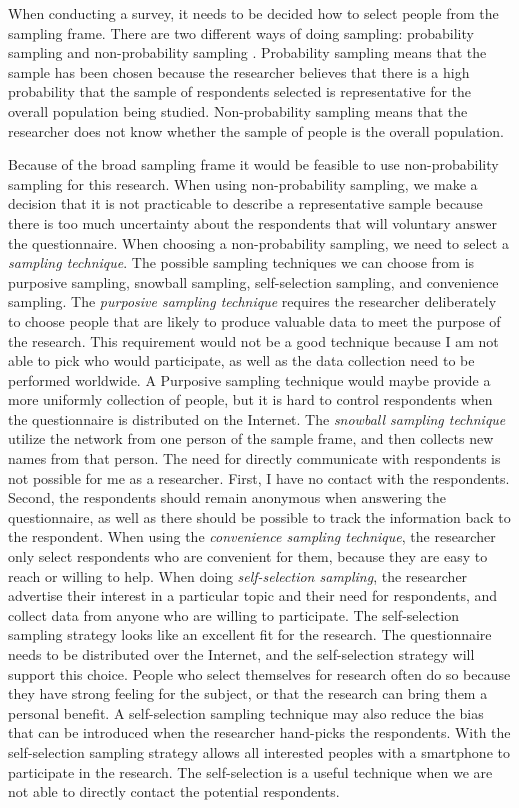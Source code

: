     When conducting a survey, it needs to be decided how to select people from the sampling frame. There are two different ways of doing sampling: probability sampling and non-probability sampling \cite{empiriske}. Probability sampling means that the sample has been chosen because the researcher believes that there is a high probability that the sample of respondents selected is representative for the overall population being studied. Non-probability sampling means that the researcher does not know whether the sample of people is the overall population.

    Because of the broad sampling frame it would be feasible to use non-probability sampling for this research. When using non-probability sampling, we make a decision that it is not practicable to describe a representative sample because there is too much uncertainty about the respondents that will voluntary answer the questionnaire. When choosing a non-probability sampling, we need to select a {\it sampling technique}. The possible sampling techniques we can choose from is purposive sampling, snowball sampling, self-selection sampling, and convenience sampling. 
    The {\it purposive sampling technique} requires the researcher deliberately to choose people that are likely to produce valuable data to meet the purpose of the research. This requirement would not be a good technique because I am not able to pick who would participate, as well as the data collection need to be performed worldwide. A Purposive sampling technique would maybe provide a more uniformly collection of people, but it is hard to control respondents when the questionnaire is distributed on the Internet. 
    The {\it snowball sampling technique} utilize the network from one person of the sample frame, and then collects new names from that person. The need for directly communicate with respondents is not possible for me as a researcher. {First}, I have no contact with the respondents. {Second}, the respondents should remain anonymous when answering the questionnaire, as well as there should be possible to track the information back to the respondent. 
    When using the {\it convenience sampling technique}, the researcher only select respondents who are convenient for them, because they are easy to reach or willing to help. 
    When doing {\it self-selection sampling}, the researcher advertise their interest in a particular topic and their need for respondents, and collect data from anyone who are willing to participate. The self-selection sampling strategy looks like an excellent fit for the research. The questionnaire needs to be distributed over the Internet, and the self-selection strategy will support this choice. People who select themselves for research often do so because they have strong feeling for the subject, or that the research can bring them a personal benefit. A self-selection sampling technique may also reduce the bias that can be introduced when the researcher hand-picks the respondents. With the self-selection sampling strategy allows all interested peoples with a smartphone to participate in the research. The self-selection is a useful technique when we are not able to directly contact the potential respondents.

